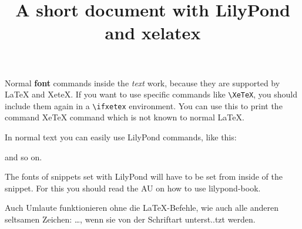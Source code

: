 \documentclass{article}
\begin{document}
\title{A short document with LilyPond and xelatex}
\maketitle

Normal \textbf{font} commands inside the \emph{text} work,
because they \textsf{are supported by \LaTeX{} and XeteX.}
If you want to use specific commands like \verb+\XeTeX+, you
should include them again in a \verb+\ifxetex+ environment.
You can use this to print the \ifxetex \XeTeX{} command \else
XeTeX command \fi which is not known to normal \LaTeX .

In normal text you can easily use LilyPond commands, like this:


\noindent
and so on.

The fonts of snippets set with LilyPond will have to be set from
inside
of the snippet. For this you should read the AU on how to use
lilypond-book.

Auch Umlaute funktionieren ohne die \LaTeX -Befehle, wie auch alle
anderen
seltsamen Zeichen: \ldots, wenn sie von der Schriftart
unterst..tzt werden.
\end{document}

